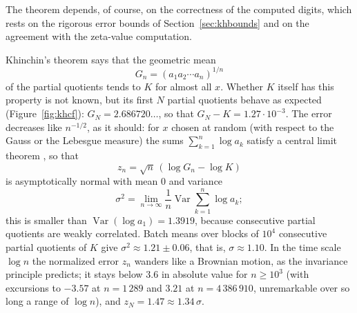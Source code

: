\documentclass[11pt]{amsart}
\theoremstyle{definition}
\theoremstyle{remark}
\begin{document}
The theorem depends, of course, on the correctness of the computed digits, which rests on the rigorous error bounds
of Section~\ref{sec:khbounds} and on the agreement with the zeta-value computation.

Khinchin's theorem \cite{Khi35} says that the geometric mean
\[
  G_n = (a_1a_2\cdots a_n)^{1/n}
\]
of the partial quotients tends to $K$ for almost all $x$. Whether $K$ itself has this property is not known, but its first $N$ partial
quotients behave as expected (Figure~\ref{fig:khcf}): $G_N = 2.686720\ldots$, so that $G_N - K = 1.27\cdot10^{-3}$. The
error decreases like $n^{-1/2}$, as it should: for $x$ chosen at random (with respect to the Gauss or the Lebesgue
measure) the sums $\sum_{k=1}^{n}\log a_k$ satisfy a central limit theorem \cite{IK02}, so that
\[
  z_n = \sqrt n\,(\log G_n - \log K)
\]
is asymptotically normal with mean $0$ and variance
\[
  \sigma^2 = \lim_{n\to\infty}\frac1n\operatorname{Var}\sum_{k=1}^{n}\log a_k;
\]
this is smaller than
$\operatorname{Var}(\log a_1) = 1.3919$, because consecutive partial quotients are weakly correlated. Batch means over
blocks of $10^4$ consecutive partial quotients of $K$ give $\sigma^2 \approx 1.21 \pm 0.06$, that is,
$\sigma \approx 1.10$. In the time scale $\log n$ the normalized error $z_n$ wanders like a Brownian motion, as the
invariance principle predicts; it stays below $3.6$ in absolute value for $n \ge 10^3$ (with excursions to $-3.57$ at
$n = 1\,289$ and $3.21$ at $n = 4\,386\,910$, unremarkable over so long a range of $\log n$), and
$z_N = 1.47 \approx 1.34\,\sigma$.
\end{document}
